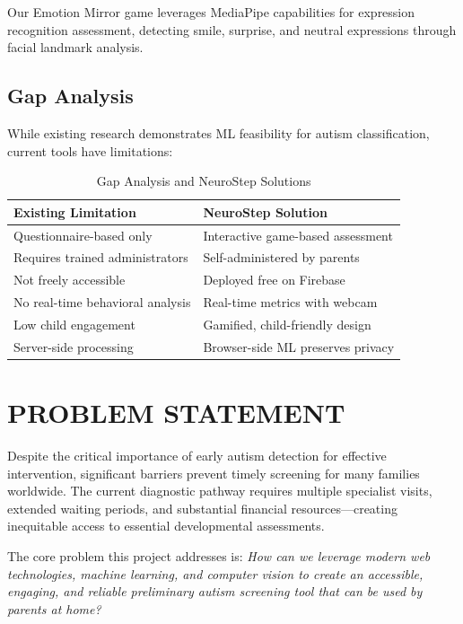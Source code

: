 \documentclass[12pt,letterpaper]{article}
\begin{document}
Our Emotion Mirror game leverages MediaPipe capabilities for expression recognition assessment, detecting smile, surprise, and neutral expressions through facial landmark analysis.

\subsection{Gap Analysis}

While existing research demonstrates ML feasibility for autism classification, current tools have limitations:

\begin{table}[H]
\centering
\begin{tabular}{|l|l|}
\hline
\textbf{Existing Limitation} & \textbf{NeuroStep Solution} \\
\hline
Questionnaire-based only & Interactive game-based assessment \\
\hline
Requires trained administrators & Self-administered by parents \\
\hline
Not freely accessible & Deployed free on Firebase \\
\hline
No real-time behavioral analysis & Real-time metrics with webcam \\
\hline
Low child engagement & Gamified, child-friendly design \\
\hline
Server-side processing & Browser-side ML preserves privacy \\
\hline
\end{tabular}
\caption{Gap Analysis and NeuroStep Solutions}
\end{table}

\newpage


\section{PROBLEM STATEMENT}

Despite the critical importance of early autism detection for effective intervention, significant barriers prevent timely screening for many families worldwide. The current diagnostic pathway requires multiple specialist visits, extended waiting periods, and substantial financial resources—creating inequitable access to essential developmental assessments.

The core problem this project addresses is: \textit{How can we leverage modern web technologies, machine learning, and computer vision to create an accessible, engaging, and reliable preliminary autism screening tool that can be used by parents at home?}
\end{document}

